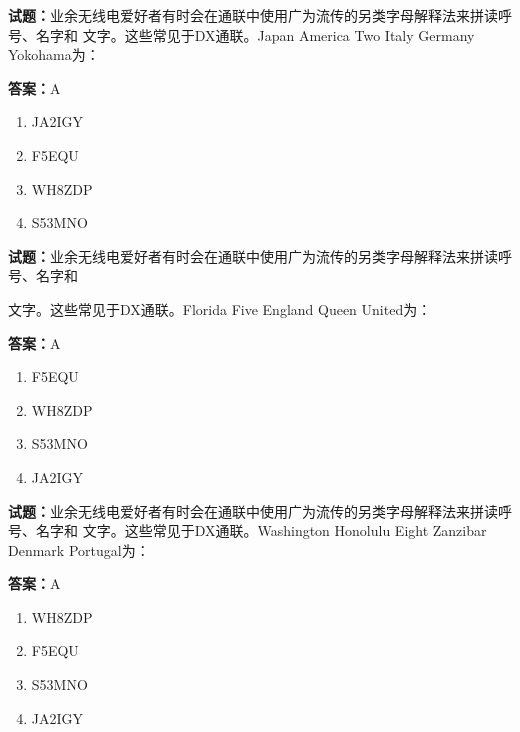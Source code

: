 \documentclass{ctexbook}
\begin{document}
\textbf{试题：}业余无线电爱好者有时会在通联中使用广为流传的另类字母解释法来拼读呼号、名字和
文字。这些常见于DX通联。Japan America Two Italy Germany Yokohama为： 

\textbf{答案：}A 

\begin{enumerate}[leftmargin=3em]
  \item JA2IGY 

  \item F5EQU 

  \item WH8ZDP 

  \item S53MNO 

\end{enumerate}





\vspace{1em}

\textbf{试题：}业余无线电爱好者有时会在通联中使用广为流传的另类字母解释法来拼读呼号、名字和


文字。这些常见于DX通联。Florida Five England Queen United为： 

\textbf{答案：}A 

\begin{enumerate}[leftmargin=3em]
  \item F5EQU 

  \item WH8ZDP 

  \item S53MNO 

  \item JA2IGY 

\end{enumerate}





\vspace{1em}

\textbf{试题：}业余无线电爱好者有时会在通联中使用广为流传的另类字母解释法来拼读呼号、名字和
文字。这些常见于DX通联。Washington Honolulu Eight Zanzibar Denmark Portugal为： 

\textbf{答案：}A 

\begin{enumerate}[leftmargin=3em]
  \item WH8ZDP 

  \item F5EQU 

  \item S53MNO 

  \item JA2IGY 

\end{enumerate}
\end{document}
